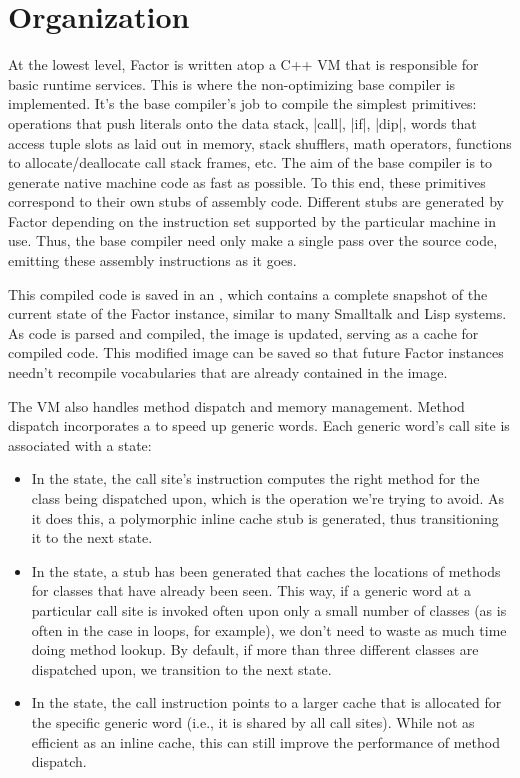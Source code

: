 \section{Organization}\label{sec:compiler:vm}

At the lowest level, Factor is written atop a C++ \gls{VM} that is responsible
for basic runtime services.  This is where the non-optimizing base compiler is
implemented.  It's the base compiler's job to compile the simplest primitives:
operations that push literals onto the data stack, \factor|call|, \factor|if|,
\factor|dip|, words that access tuple slots as laid out in memory, stack
shufflers, math operators, functions to allocate/deallocate call stack frames,
etc.  The aim of the base compiler is to generate native machine code as fast
as possible.  To this end, these primitives correspond to their own stubs of
assembly code.  Different stubs are generated by Factor depending on the
instruction set supported by the particular machine in use.  Thus, the base
compiler need only make a single pass over the source code, emitting these
assembly instructions as it goes.

This compiled code is saved in an , which contains a complete
snapshot of the current state of the Factor instance, similar to many Smalltalk
and Lisp systems.  As code is parsed and compiled, the image is
updated, serving as a cache for compiled code.  This modified image can be
saved so that future Factor instances needn't recompile vocabularies that are
already contained in the image.

The \gls{VM} also handles method dispatch and memory management.  Method
dispatch incorporates a  to speed up generic
words.  Each generic word's call site is associated with a state:
\begin{itemize}
  \item In the  state, the call site's instruction computes the
        right method for the class being dispatched upon, which is the
        operation we're trying to avoid.  As it does this, a polymorphic inline
        cache stub is generated, thus transitioning it to the next state.
  \item In the  state, a stub has been generated that caches
        the locations of methods for classes that have already been seen.  This
        way, if a generic word at a particular call site is invoked often upon
        only a small number of classes (as is often in the case in loops, for
        example), we don't need to waste as much time doing method lookup.  By
        default, if more than three different classes are dispatched upon, we
        transition to the next state.
  \item In the  state, the call instruction points to a
        larger cache that is allocated for the specific generic word (i.e., it
        is shared by all call sites).  While not as efficient as an inline
        cache, this can still improve the performance of method dispatch.
\end{itemize}

